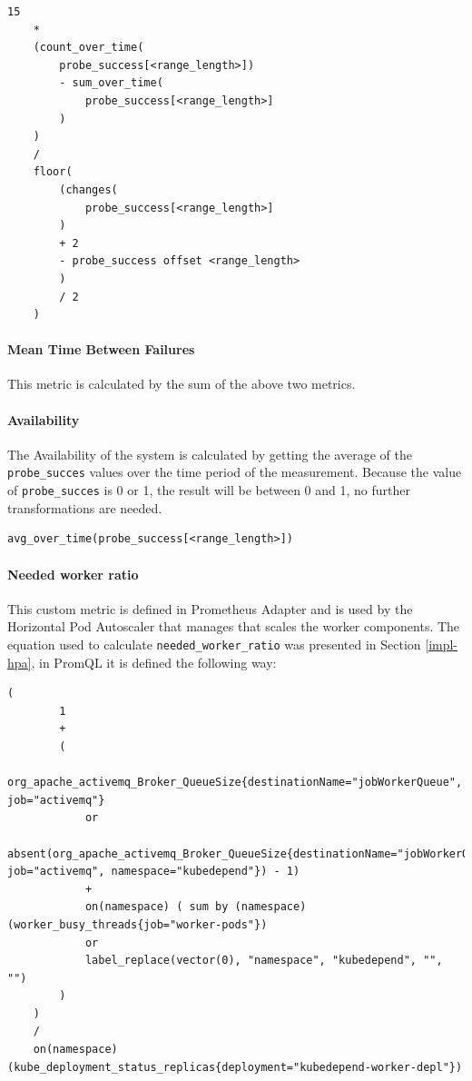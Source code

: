  \vspace{0.5cm}
 \begin{minipage}{\linewidth}
 	\begin{lstlisting}[caption={Mean Up Time defined in PromQL}, label={lst:promql-mut}]
 	15 
 	* 
 	(count_over_time(
 		probe_success[<range_length>])
 		- sum_over_time(
 			probe_success[<range_length>]
 		)
 	)
 	/ 
 	floor(
 		(changes(
 			probe_success[<range_length>]
 		)
 		+ 2
 		- probe_success offset <range_length>
 		)
 		/ 2
 	)\end{lstlisting}
 \end{minipage}
 
 \paragraph{Mean Time Between Failures} This metric is calculated by the sum of the above two metrics.
 
 \paragraph{Availability} The Availability of the system is calculated by getting the average of the \texttt{probe\_succes} values over the time period of the measurement. Because the value of \texttt{probe\_succes} is 0 or 1, the result will be between 0 and 1, no further transformations are needed.
 
 \vspace{0.5cm}
 \begin{minipage}{\linewidth}
 	\begin{lstlisting}[caption={Availability defined in PromQL}, label={lst:promql-availability}]
 	avg_over_time(probe_success[<range_length>])\end{lstlisting}
 \end{minipage}

\paragraph{Needed worker ratio} This custom metric is defined in Prometheus Adapter and is used by the Horizontal Pod Autoscaler that manages that scales the worker components. The equation used to calculate \texttt{needed\_worker\_ratio} was presented in Section \ref{impl-hpa}, in PromQL it is defined the following way:

\vspace{0.5cm}
\begin{minipage}{\linewidth}
	\begin{lstlisting}[caption={\texttt{needed\_worker\_ratio} defined in PromQL}, label={lst:promql-availability}]
	(
		1
		+
		(
			org_apache_activemq_Broker_QueueSize{destinationName="jobWorkerQueue", job="activemq"}
			or
			absent(org_apache_activemq_Broker_QueueSize{destinationName="jobWorkerQueue", job="activemq", namespace="kubedepend"}) - 1)
			+
			on(namespace) ( sum by (namespace) (worker_busy_threads{job="worker-pods"})
			or
			label_replace(vector(0), "namespace", "kubedepend", "", "")
		)
	)
	/
	on(namespace) (kube_deployment_status_replicas{deployment="kubedepend-worker-depl"})\end{lstlisting}
\end{minipage}

